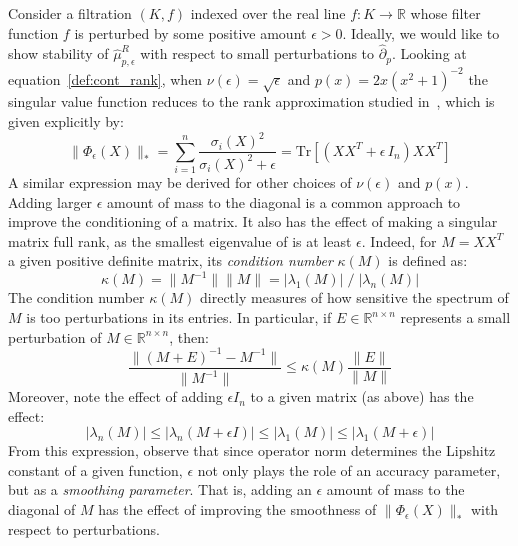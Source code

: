 \documentclass[12pt]{article}
\numberwithin{equation}{section}
\newcommand{\+}{%
	\raisebox{0.18ex}{\scaleobj{0.55}{+}}
}
\theoremstyle{definition}
\begin{document}
Consider a filtration $(K, f)$ indexed over the real line $f : K \to \mathbb{R}$ whose filter function $f$ is perturbed by some positive amount $\epsilon > 0$. Ideally, we would like to show stability of $\hat{\mu}_{p,\epsilon}^R$ with respect to small perturbations to $\hat{\partial}_p$.
Looking at equation~\eqref{def:cont_rank}, when $\nu(\epsilon) = \sqrt{\epsilon}$ and $p(x) = 2x (x^2 + 1)^{-2}$ the singular value function reduces to the rank approximation studied in~\cite{}, which is given explicitly by: 
\begin{equation*}
	\lVert \Phi_\epsilon(X) \rVert_\ast = \sum\limits_{i = 1}^n \frac{\sigma_i(X)^2}{\sigma_i(X)^2 + \epsilon} = \mathrm{Tr}\left[(X X^T + \epsilon \, I_n) X X^T \right] 
\end{equation*}
A similar expression may be derived for other choices of $\nu(\epsilon)$ and $p(x)$. Adding larger $\epsilon$ amount of mass to the diagonal is a common approach to improve the conditioning of a matrix. It also has the effect of making a singular matrix full rank, as the smallest eigenvalue of is at least $\epsilon$. %
Indeed, for $M = X X^T$ a given positive definite matrix, its \emph{condition number} $\kappa(M)$ is defined as: 
\begin{equation}
	\kappa(M) = \lVert M^{-1} \rVert \lVert M \rVert = \lvert \lambda_1(M) \rvert \; / \; \lvert \lambda_n(M) \rvert
\end{equation}
The condition number $\kappa(M)$ directly measures of how sensitive the spectrum of $M$ is too perturbations in its entries. 
In particular, if $E \in \mathbb{R}^{n \times n}$ represents a small perturbation of $M \in \mathbb{R}^{n \times n}$, then: 
\begin{equation}
\frac{\lVert (M + E)^{-1}  - M^{-1} \rVert}{\lVert M^{-1} \rVert} \leq \kappa(M) \frac{\lVert E \rVert}{ \lVert M \rVert }
\end{equation}
Moreover, note the effect of adding $\epsilon I_n$ to a given matrix (as above) has the effect:  
\begin{equation}
\lvert \lambda_n(M) \rvert  \leq \lvert \lambda_n(M + \epsilon I) \rvert  \leq \lvert \lambda_1(M) \rvert \leq \lvert \lambda_1(M + \epsilon) \rvert 
\end{equation}
From this expression,  observe that since operator norm determines the Lipshitz constant of a given function, $\epsilon$ not only plays the role of an accuracy parameter, but as a \emph{smoothing parameter}. 
That is, adding an $\epsilon$ amount of mass to the diagonal of $M$ has the effect of improving the smoothness of $\lVert \Phi_\epsilon(X) \rVert_\ast$ with respect to perturbations.
\end{document}

